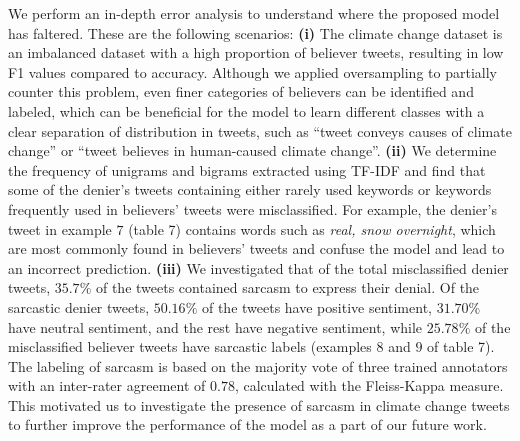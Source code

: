 \documentclass[letterpaper]{article} %
\begin{document}
We perform an in-depth error analysis to understand where the proposed model has faltered. These are the following scenarios: \textbf{(i)} The climate change dataset is an imbalanced dataset with a high proportion of believer tweets, resulting in low F1 values compared to accuracy. Although we applied oversampling to partially counter this problem, even finer categories of believers can be identified and labeled, which can be beneficial for the model to learn different classes with a clear separation of distribution in tweets, such as ``tweet conveys causes of climate change'' or ``tweet believes in human-caused climate change''. \textbf{(ii)} We determine the frequency of unigrams and bigrams extracted using TF-IDF and find that some of the denier's tweets containing either rarely used keywords or keywords frequently used in believers' tweets were misclassified. For example, the denier's tweet in example $7$ (table 7) contains words such as \textit{real, snow overnight}, which are most commonly found in believers' tweets and confuse the model and lead to an incorrect prediction. \textbf{(iii)} We investigated that of the total misclassified denier tweets, $35.7\%$ of the tweets contained sarcasm to express their denial. Of the sarcastic denier tweets, $50.16\%$ of the tweets have positive sentiment, $31.70\%$ have neutral sentiment, and the rest have negative sentiment, while $25.78\%$ of the misclassified believer tweets have sarcastic labels (examples $8$ and $9$ of table 7). The labeling of sarcasm is based on the majority vote of three trained annotators with an inter-rater agreement of $0.78$, calculated with the Fleiss-Kappa measure. This motivated us to investigate the presence of sarcasm in climate change tweets to further improve the performance of the model as a part of our future work. %
\end{document}
